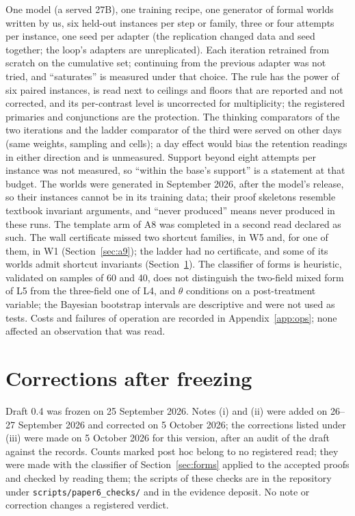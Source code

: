 \documentclass[11pt]{article}
\begin{document}
One model (a served 27B), one training recipe, one generator of formal
worlds written by us, six held-out instances per step or family, three
or four attempts per instance, one seed per adapter (the replication
changed data and seed together; the loop's adapters are unreplicated).
Each iteration retrained from scratch on the cumulative set; continuing
from the previous adapter was not tried, and ``saturates'' is measured
under that choice. The rule has the power of six paired instances, is read
next to ceilings and floors that are reported and not corrected, and its
per-contrast level is uncorrected for multiplicity; the registered
primaries and conjunctions are the protection. The thinking comparators
of the two iterations and the ladder comparator of the third were served
on other days (same weights, sampling and cells); a day effect would bias
the retention readings in either direction and is unmeasured. Support
beyond eight attempts per instance was not measured, so ``within the
base's support'' is a statement at that budget. The worlds were generated
in September 2026, after the model's release, so their instances cannot
be in its training data; their proof skeletons resemble textbook
invariant arguments, and ``never produced'' means never produced in these
runs. The template arm of A8 was completed in a second read declared as
such. The wall certificate missed two shortcut families, in W5 and, for
one of them, in W1 (Section~\ref{sec:a9}); the ladder had no certificate,
and some of its worlds admit shortcut invariants
(Section~\ref{sec:corrections}). The classifier of forms is heuristic, validated on
samples of 60 and 40, does not distinguish the two-field mixed form of L5
from the three-field one of L4, and $\theta$ conditions on a
post-treatment variable; the Bayesian bootstrap intervals are descriptive and were not used as tests. Costs and failures of operation are recorded in
Appendix~\ref{app:ops}; none affected an observation that was read.

\section{Corrections after freezing}
\label{sec:corrections}

Draft 0.4 was frozen on 25 September 2026. Notes (i) and (ii) were added
on 26--27 September 2026 and corrected on 5 October 2026; the corrections
listed under (iii) were made on 5 October 2026 for this version, after an
audit of the draft against the records. Counts marked post hoc belong to
no registered read; they were made with the classifier of
Section~\ref{sec:forms} applied to the accepted proofs and checked by
reading them; the scripts of these checks are in the repository under \texttt{scripts/paper6\_checks/} and in the evidence deposit. No note or correction changes a registered verdict.
\end{document}
